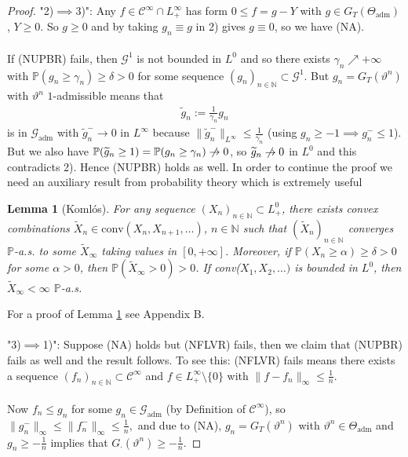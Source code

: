 \documentclass[12pt,a4paper, twoside]{article}
\newtheorem{lem}{Lemma}[section]
\theoremstyle{definition}
\newcommand{\PP}{\mathbb{P}} %
\begin{document}
\begin{proof}
"2)$\implies$3)": Any $f \in \mathcal{C}^\infty \cap L_+^\infty$ has form $0 \leq f= g-Y$ with $g \in G_T( \Theta_\text{adm})$, $Y \geq 0$. So $g \geq 0$ and by taking $g_n \equiv g$ in 2) gives $g \equiv 0$, so we have (NA). \\
\\
If (NUPBR) fails, then $\mathcal{G}^1$ is not bounded in $L^0$ and so there exists $ \gamma_n \nearrow + \infty$ with $\PP(g_n \geq \gamma_n) \geq \delta >0$ for some sequence $(g_n)_{n \in \mathbb{N}} \subset \mathcal{G}^1$. But $g_n = G_T( \vartheta^n)$ with $\vartheta^n$ $1$-admissible means that  
\begin{align*}
\widetilde{g}_n:= \frac{1}{\gamma_n}g_n
\end{align*}
is in $\mathcal{G}_\text{adm}$ with $\widetilde{g}_n^- \to 0$ in $L^\infty$ because $\| \widetilde{g}_n^- \|_{L^\infty} \leq \frac{1}{\gamma_n}$ (using $g_n \geq -1 \implies g_n^- \leq 1$).  But we also have $\PP( \widetilde{g}_n \geq 1) = \PP(g_n \geq \gamma_n) \centernot\to 0$, so $\widetilde{g}_n \centernot\to 0$ in $L^0$ and this contradicts 2). Hence (NUPBR) holds as well.
\newpage
In order to continue the proof we need an auxiliary result from probability theory which is extremely useful
\begin{lem}[Komlós]\label{L44} For any sequence $(X_n)_{n \in \mathbb{N}} \subset L_+^0$, there exists convex combinations $\widetilde{X}_n \in \text{conv}(X_n,X_{n+1}, \dots )$, $n \in \mathbb{N}$ such that $(\widetilde{X}_n)_{n \in \mathbb{N}}$ converges $\PP$-a.s. to some $\widetilde{X}_\infty$ taking values in $[0, + \infty]$. Moreover, if $\PP( X_n \geq \alpha) \geq \delta > 0$ for some $\alpha >0$, then $\PP( \widetilde{X}_\infty >0 ) >0$. If conv($X_1, X_2, \dots )$ is bounded in $L^0$, then $\widetilde{X}_\infty < \infty$ $\PP$-a.s. 
\end{lem}
For a proof of Lemma \ref{L44} see Appendix B.
\\
\\
"3)$\implies$1)": Suppose (NA) holds but (NFLVR) fails, then we claim that (NUPBR) fails as well and the result follows. To see this: (NFLVR) fails means there exists a sequence $(f_n)_{n \in \mathbb{N}} \subset \mathcal{C}^\infty$ and $f \in L_+^\infty \setminus \{0\}$ with $\|f-f_n\|_\infty \leq \frac{1}{n}$. \\
\\
Now $f_n \leq g_n$ for some $g_n \in \mathcal{G}_\text{adm}$ (by Definition of $\mathcal{C}^\infty$), so $\|g_n^-\|_\infty \leq \|f_n^-\|_\infty \leq \frac{1}{n},$ and due to (NA), $g_n = G_T( \vartheta^n)$ with $\vartheta^n \in \Theta_\text{adm}$ and $g_n \geq - \frac{1}{n}$ implies that $G_\cdot ( \vartheta^n) \geq - \frac{1}{n}$. 

\end{proof}
\end{document}
